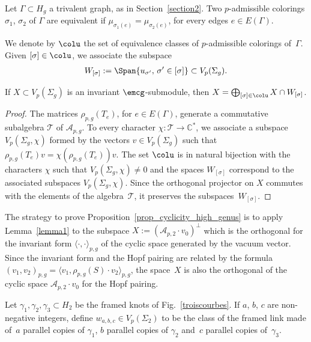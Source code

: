 Let $\Gamma\subset H_g$ a trivalent graph, as in Section~\ref{section2}. Two $p$-admissible colorings $\sigma_1$, $\sigma_2$ of $\Gamma$ are equivalent if $\mu_{\sigma_1(e)}=\mu_{\sigma_2(e)}$, for every edges $e \in E(\Gamma)$.

We denote by $\colu$ the set of equivalence classes of $p$-admissible colorings of~$\Gamma$. Given $[\sigma]\in \colu$, we associate the subspace
\begin{gather*} W_{[\sigma]} := \Span \{ u_{\sigma'},\, \sigma'\in [\sigma] \} \subset V_p(\Sigma_g). \end{gather*}

\begin{Lemma}\label{lemma1}If $X\subset V_p(\Sigma_g)$ is an invariant $\emcg$-submodule, then $ X=\bigoplus_{[\sigma]\in \colu} X\cap W_{[\sigma]}$.
\end{Lemma}

\begin{proof} The matrices $\rho_{p,g}(T_e)$, for $e\in E(\Gamma)$, generate a commutative subalgebra $\mathcal{T}$ of $\mathcal{A}_{p,g}$. To every character $\chi \colon \mathcal{T}\rightarrow \mathbb{C}^*$, we associate a subspace $V_p(\Sigma_g, \chi)$ formed by the vectors $v\in V_p(\Sigma_g)$ such that $\rho_{p,g}(T_e)v=\chi(\rho_{p,g}(T_e))v$. The set $\colu$ is in natural bijection with the characters $\chi$ such that $V_p(\Sigma_g,\chi)\neq 0$ and the spaces $W_{[\sigma]}$ correspond to the associated subspaces $V_p(\Sigma_g, \chi)$. Since the orthogonal projector on $X$ commutes with the elements of the algebra~$\mathcal{T}$, it preserves the subspaces~$W_{[\sigma]}$.
\end{proof}

The strategy to prove Proposition~\ref{prop_cyclicity_high_genus} is to apply Lemma~\ref{lemma1} to the subspace $ X:= ( \mathcal{A}_{p,2}\cdot v_0 ) ^{\bot}$ which is the orthogonal for the invariant form $\langle \cdot, \cdot \rangle_{p,g}$ of the cyclic space generated by the vacuum vector. Since the invariant form and the Hopf pairing are related by the formula $(v_1, v_2)_{p,g}=\langle v_1, \rho_{p,g}(S)\cdot v_2\rangle_{p,g}$, the space~$X$ is also the orthogonal of the cyclic space $\mathcal{A}_{p,2}\cdot v_0$ for the Hopf pairing.

Let $\gamma_1, \gamma_2, \gamma_3 \subset H_2$ be the framed knots of Fig.~\ref{troiscourbes}. If $a$, $b$, $c$ are non-negative integers, define $w_{a,b,c}\in V_p(\Sigma_2)$ to be the class of the framed link made of~$a$ parallel copies of $\gamma_1$, $b$ parallel copies of $\gamma_2$ and~$c$ parallel copies of~$\gamma_3$.

